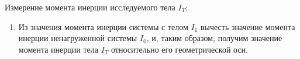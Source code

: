 \item Измерение момента инерции исследуемого тела $I_T$:
    \begin{enumerate}
        \item Из значения момента инерции системы с телом $I_1$
        вычесть значение момента инерции ненагруженной системы $I_0$, и,
        таким образом, получим значение момента инерции тела $I_T$
        относительно его геометрической оси. 
    \end{enumerate}